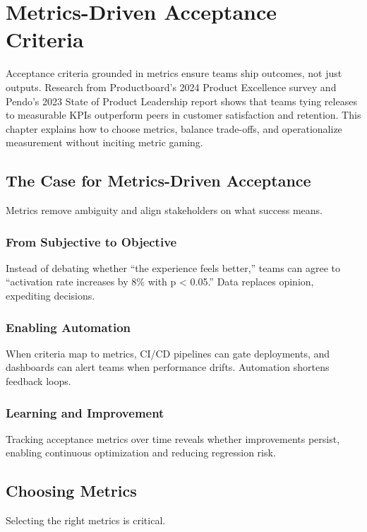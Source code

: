 \chapter{Metrics-Driven Acceptance Criteria}
\label{ch:metrics-driven}

Acceptance criteria grounded in metrics ensure teams ship outcomes, not just outputs. Research from Productboard’s 2024 Product Excellence survey and Pendo’s 2023 State of Product Leadership report shows that teams tying releases to measurable KPIs outperform peers in customer satisfaction and retention. This chapter explains how to choose metrics, balance trade-offs, and operationalize measurement without inciting metric gaming.

\section{The Case for Metrics-Driven Acceptance}
\label{sec:case-metrics}

Metrics remove ambiguity and align stakeholders on what success means.

\subsection{From Subjective to Objective}
Instead of debating whether ``the experience feels better,'' teams can agree to ``activation rate increases by 8\% with p \textless{} 0.05.'' Data replaces opinion, expediting decisions.

\subsection{Enabling Automation}
When criteria map to metrics, CI/CD pipelines can gate deployments, and dashboards can alert teams when performance drifts. Automation shortens feedback loops.

\subsection{Learning and Improvement}
Tracking acceptance metrics over time reveals whether improvements persist, enabling continuous optimization and reducing regression risk.

\section{Choosing Metrics}
\label{sec:choosing-metrics}

Selecting the right metrics is critical.

